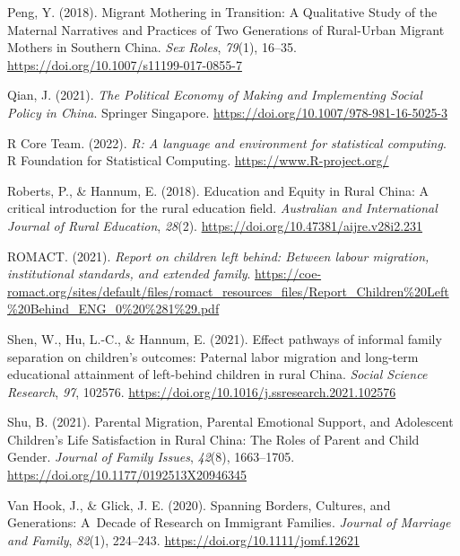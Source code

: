 \documentclass[
  man,floatsintext]{apa7}
\newlength{\cslhangindent}
\newlength{\cslentryspacingunit} %
\newenvironment{CSLReferences}[2] %
 {%
  \setlength{\parindent}{0pt}
  \ifodd #1
  \let\oldpar\par
  \def\par{\hangindent=\cslhangindent\oldpar}
  \fi
  \setlength{\parskip}{#2\cslentryspacingunit}
 }%
 {}
\begin{document}
\begin{CSLReferences}{1}{0}
\leavevmode{}%
Peng, Y. (2018). Migrant Mothering in Transition: A Qualitative Study of the Maternal Narratives and Practices of Two Generations of Rural-Urban Migrant Mothers in Southern China. \emph{Sex Roles}, \emph{79}(1), 16--35. \url{https://doi.org/10.1007/s11199-017-0855-7}

\leavevmode{}%
Qian, J. (2021). \emph{The Political Economy of Making and Implementing Social Policy in China}. Springer Singapore. \url{https://doi.org/10.1007/978-981-16-5025-3}

\leavevmode{}%
R Core Team. (2022). \emph{R: A language and environment for statistical computing}. R Foundation for Statistical Computing. \url{https://www.R-project.org/}

\leavevmode{}%
Roberts, P., \& Hannum, E. (2018). Education and Equity in Rural China: A critical introduction for the rural education field. \emph{Australian and International Journal of Rural Education}, \emph{28}(2). \url{https://doi.org/10.47381/aijre.v28i2.231}

\leavevmode{}%
ROMACT. (2021). \emph{Report on children left behind: Between labour migration, institutional standards, and extended family}. \url{https://coe-romact.org/sites/default/files/romact_resources_files/Report_Children\%20Left\%20Behind_ENG_0\%20\%281\%29.pdf}

\leavevmode{}%
Shen, W., Hu, L.-C., \& Hannum, E. (2021). Effect pathways of informal family separation on children's outcomes: Paternal labor migration and long-term educational attainment of left-behind children in rural China. \emph{Social Science Research}, \emph{97}, 102576. \url{https://doi.org/10.1016/j.ssresearch.2021.102576}

\leavevmode{}%
Shu, B. (2021). Parental Migration, Parental Emotional Support, and Adolescent Children{'}s Life Satisfaction in Rural China: The Roles of Parent and Child Gender. \emph{Journal of Family Issues}, \emph{42}(8), 1663--1705. \url{https://doi.org/10.1177/0192513X20946345}

\leavevmode{}%
Van Hook, J., \& Glick, J. E. (2020). Spanning Borders, Cultures, and Generations: A~Decade of Research on Immigrant Families. \emph{Journal of Marriage and Family}, \emph{82}(1), 224--243. \url{https://doi.org/10.1111/jomf.12621}


\end{CSLReferences}
\end{document}

